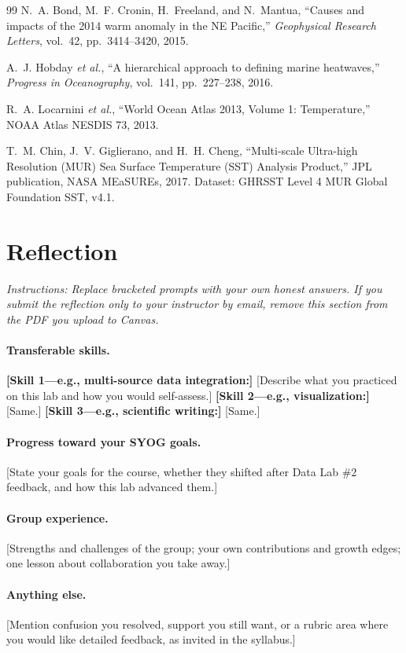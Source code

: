 \documentclass[11pt,letterpaper]{article}
\begin{document}
\begin{thebibliography}{99}
N.~A. Bond, M.~F. Cronin, H.~Freeland, and N.~Mantua, ``Causes and impacts of the 2014 warm anomaly in the NE Pacific,'' \emph{Geophysical Research Letters}, vol.~42, pp.~3414--3420, 2015.

A.~J. Hobday \emph{et al.}, ``A hierarchical approach to defining marine heatwaves,'' \emph{Progress in Oceanography}, vol.~141, pp.~227--238, 2016.

R.~A. Locarnini \emph{et al.}, ``World Ocean Atlas 2013, Volume 1: Temperature,'' NOAA Atlas NESDIS 73, 2013.

T.~M. Chin, J.~V. Giglierano, and H.~H. Cheng, ``Multi-scale Ultra-high Resolution (MUR) Sea Surface Temperature (SST) Analysis Product,'' JPL publication, NASA MEaSUREs, 2017. Dataset: GHRSST Level 4 MUR Global Foundation SST, v4.1.
\end{thebibliography}

\newpage
\section*{Reflection}

\textit{Instructions: Replace bracketed prompts with your own honest answers. If you submit the reflection only to your instructor by email, remove this section from the PDF you upload to Canvas.}

\paragraph{Transferable skills.}
\textbf{[Skill 1---e.g., multi-source data integration:]} [Describe what you practiced on this lab and how you would self-assess.]
\textbf{[Skill 2---e.g., visualization:]} [Same.]
\textbf{[Skill 3---e.g., scientific writing:]} [Same.]

\paragraph{Progress toward your SYOG goals.}
[State your goals for the course, whether they shifted after Data Lab \#2 feedback, and how this lab advanced them.]

\paragraph{Group experience.}
[Strengths and challenges of the group; your own contributions and growth edges; one lesson about collaboration you take away.]

\paragraph{Anything else.}
[Mention confusion you resolved, support you still want, or a rubric area where you would like detailed feedback, as invited in the syllabus.]
\end{document}
